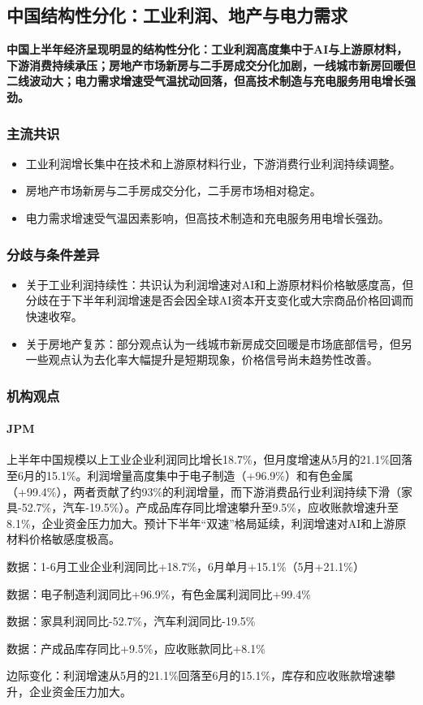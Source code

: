 \documentclass[11pt]{ctexart}
\begin{document}
\subsection{中国结构性分化：工业利润、地产与电力需求}
\textbf{中国上半年经济呈现明显的结构性分化：工业利润高度集中于AI与上游原材料，下游消费持续承压；房地产市场新房与二手房成交分化加剧，一线城市新房回暖但二线波动大；电力需求增速受气温扰动回落，但高技术制造与充电服务用电增长强劲。}
\subsubsection*{主流共识}
\begin{itemize}
  \item 工业利润增长集中在技术和上游原材料行业，下游消费行业利润持续调整。
  \item 房地产市场新房与二手房成交分化，二手房市场相对稳定。
  \item 电力需求增速受气温因素影响，但高技术制造和充电服务用电增长强劲。
\end{itemize}
\subsubsection*{分歧与条件差异}
\begin{itemize}
  \item 关于工业利润持续性：共识认为利润增速对AI和上游原材料价格敏感度高，但分歧在于下半年利润增速是否会因全球AI资本开支变化或大宗商品价格回调而快速收窄。
  \item 关于房地产复苏：部分观点认为一线城市新房成交回暖是市场底部信号，但另一些观点认为去化率大幅提升是短期现象，价格信号尚未趋势性改善。
\end{itemize}
\subsubsection*{机构观点}
\paragraph{JPM} 上半年中国规模以上工业企业利润同比增长18.7\%，但月度增速从5月的21.1\%回落至6月的15.1\%。利润增量高度集中于电子制造（+96.9\%）和有色金属（+99.4\%），两者贡献了约93\%的利润增量，而下游消费品行业利润持续下滑（家具-52.7\%，汽车-19.5\%）。产成品库存同比增速攀升至9.5\%，应收账款增速升至8.1\%，企业资金压力加大。预计下半年“双速”格局延续，利润增速对AI和上游原材料价格敏感度极高。
{\small\color{refgray}数据：1-6月工业企业利润同比+18.7\%，6月单月+15.1\%（5月+21.1\%）\par}
{\small\color{refgray}数据：电子制造利润同比+96.9\%，有色金属利润同比+99.4\%\par}
{\small\color{refgray}数据：家具利润同比-52.7\%，汽车利润同比-19.5\%\par}
{\small\color{refgray}数据：产成品库存同比+9.5\%，应收账款同比+8.1\%\par}
{\small\color{refgray}边际变化：利润增速从5月的21.1\%回落至6月的15.1\%，库存和应收账款增速攀升，企业资金压力加大。\par}
\end{document}
